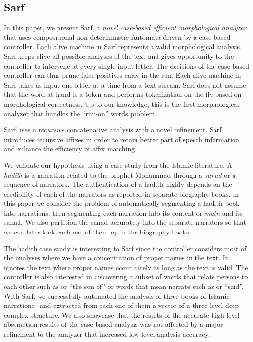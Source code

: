 \documentclass[11pt,letterpaper]{article}
\begin{document}
\subsection{Sarf}
\label{sec:intro:sarf}

In this paper, we present Sarf, a {\em novel case-based efficient
morphological analyzer} that uses compositional 
non-deterministic Automata driven by a case based controller.
Each alive machine in Sarf represents a valid morphological analysis. 
Sarf keeps alive all possible analyses of the text and gives 
opportunity to the controller to intervene at every single input 
letter. 
The decisions of the case-based controller can thus prune false 
positives early in the run. 
Each alive machine in Sarf takes as input one letter at a time 
from a text stream. 
Sarf does not assume that the word at hand is a token and
performs tokenization on the fly based on morphological correctness.
Up to our knowledge, this is the first morphological analyzer that 
handles the ``run-on'' words problem. 

Sarf uses a {\em recursive} concatenative analysis with a novel 
refinement. 
Sarf introduces recursive affixes in order to
retain better part of speech information and enhance the 
efficiency of affix matching. 

We validate our hypothesis using a case study from the Islamic 
literature. 
A {\em hadith} is a narration related to the prophet Mohammad
through a {\em sanad} or a sequence of narrators. 
The authentication of a hadith highly depends on the credibility
of each of the narrators as reported in separate biography 
books. 
In this paper we consider the problem of automatically segmenting
a hadith book into narrations, then segmenting each narration into
its content or {\em matn} and its sanad.
We also partition the sanad accurately into the 
separate narrators so that we can later look each one of them 
up in the biography books. 

The hadith case study is interesting to Sarf since the controller
considers most of the analyses where we have a concentration
of proper names in the text. It ignores the text where
proper names occur rarely as long 
as the text is valid.
The controller is also interested in discovering a subset of words 
that relate persons to each other such as  or ``the son of''
or words that mean narrate such as  or ``said''. 
With Sarf, we successfully automated the analysis of 
three books of Islamic narrations~\cite{IbnHanbal,AlTousi,AlKulayni}
and extracted from each one of them a vector of a three level deep
complex structure. 
We also showcase that the results of the accurate high level abstraction
results of the case-based analysis was not affected by a major
refinement to the analyzer that increased low level analysis accuracy. 
\end{document}
